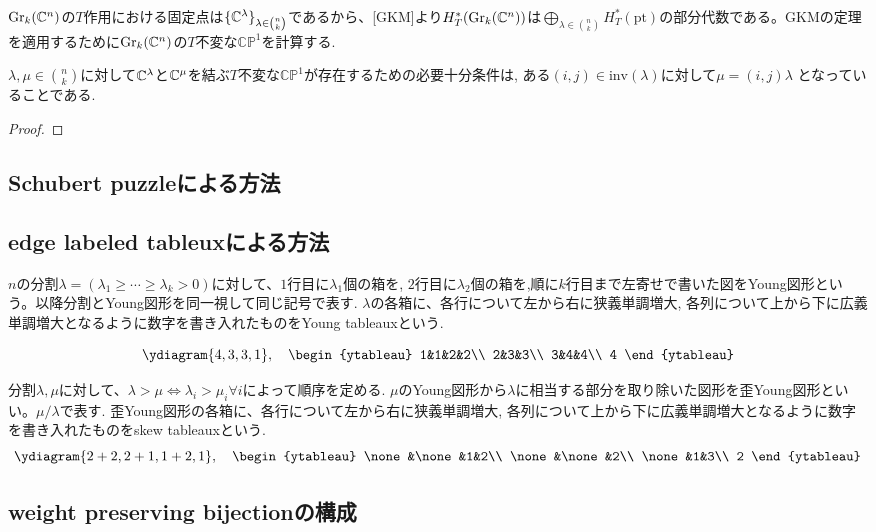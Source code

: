 $\text{Gr}_k(\mathbb{C}^n)$の$T$作用における固定点は$\{\mathbb{C}^\lambda\}_{\lambda\in\binom{n}{k}}$であるから、[GKM]より$H^*_T(\text{Gr}_k(\mathbb{C}^n))$は$\bigoplus_{\lambda\in\binom{n}{k}}H^*_T(\text{pt})$の部分代数である。GKMの定理を適用するために$\text{Gr}_k(\mathbb{C}^n)$の$T$不変な$\mathbb{CP}^1$を計算する.

\begin{prop}
  $\lambda,\mu\in\binom{n}{k}$に対して$\mathbb{C}^\lambda$と$\mathbb{C}^\mu$を結ぶ$T$不変な$\mathbb{CP}^1$が存在するための必要十分条件は, ある$(i, j)\in\text{inv}(\lambda)$に対して$\mu = (i, j)\lambda$
  となっていることである.
\end{prop}

\begin{proof}
  
\end{proof}




\subsection{Schubert puzzleによる方法}


\subsection{edge labeled tableuxによる方法}

$n$の分割$\lambda=(\lambda_1\geq\cdots\geq\lambda_k>0)$に対して、$1$行目に$\lambda_1$個の箱を, $2$行目に$\lambda_2$個の箱を,順に$k$行目まで左寄せで書いた図をYoung図形という。以降分割とYoung図形を同一視して同じ記号で表す. $\lambda$の各箱に、各行について左から右に狭義単調増大, 各列について上から下に広義単調増大となるように数字を書き入れたものをYoung tableauxという. 

\[
\ydiagram{4, 3, 3, 1},
\quad\begin{ytableau}
    1&1&2&2\\
    2&3&3\\
    3&4&4\\
    4
\end{ytableau}
\]

分割$\lambda, \mu$に対して、$\lambda>\mu\Leftrightarrow \lambda_i>\mu_i \forall i$によって順序を定める. $\mu$のYoung図形から$\lambda$に相当する部分を取り除いた図形を歪Young図形といい。$\mu/\lambda$で表す. 歪Young図形の各箱に、各行について左から右に狭義単調増大, 各列について上から下に広義単調増大となるように数字を書き入れたものをskew tableauxという. 
\[
\ydiagram{2+2, 2+1, 1+2, 1},
\quad\begin{ytableau}
    \none&\none&1&2\\
    \none&\none&2\\
    \none&1&3\\
    2
\end{ytableau}
\]





\subsection{weight preserving bijectionの構成}